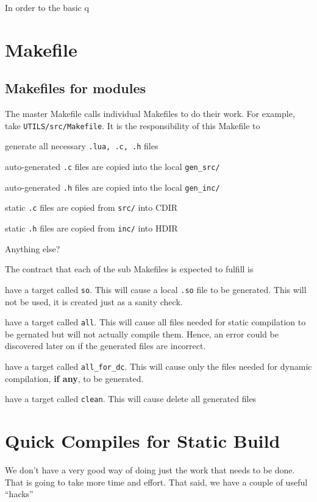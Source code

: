 In order to the basic q


\section{Makefile}

\subsection{Makefiles for modules}
The master Makefile calls individual Makefiles to do their work. For example,
take \verb+UTILS/src/Makefile+. It is the responsibility of this Makefile to
\be
\item generate all necessary {\tt .lua, .c, .h} files
\item auto-generated {\tt .c} files are copied into the local \verb+gen_src/+ 
\item auto-generated {\tt .h} files are copied into the local \verb+gen_inc/+ 

\item static {\tt .c} files are copied from {\tt src/} into CDIR
\item static {\tt .h} files are copied from {\tt inc/} into HDIR
\item Anything else? \TBC
\ee

The contract that each of the sub Makefiles is expected to fulfill is
\be
\item 
have a target called {\tt so}. This will cause a local \verb+.so+ file 
to be generated. This will not be used, it is created just as a 
sanity check.
\item have a target called {\tt all}. This will cause all files needed for
static compilation to be gernated but will not actually compile them. Hence, an
error could be discovered later on if the generated files are incorrect.
\item have a target called {\tt all\_for\_dc}. This will cause only the files needed for
dynamic compilation, {\bf if any}, to be generated.

\item have a target called {\tt clean}. This will cause delete all generated
files
\ee

\section{Quick Compiles for Static Build}

We don't have a very good way of doing just the work that needs to be done. That
is going to take more time and effort. That said, we have a couple of useful
``hacks''

